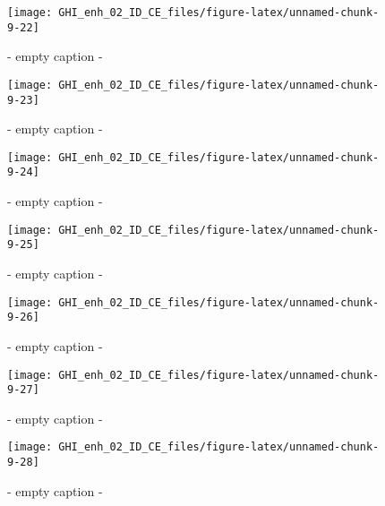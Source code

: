 \documentclass[
  10pt,
  a4paper,oneside]{article}
\begin{document}
\begin{figure}[H]

{\centering \texttt{[image: GHI\_enh\_02\_ID\_CE\_files/figure-latex/unnamed-chunk-9-22]} 

}

\caption{ - empty caption - }\label{fig:unnamed-chunk-9-22}
\end{figure}
\begin{figure}[H]

{\centering \texttt{[image: GHI\_enh\_02\_ID\_CE\_files/figure-latex/unnamed-chunk-9-23]} 

}

\caption{ - empty caption - }\label{fig:unnamed-chunk-9-23}
\end{figure}
\begin{figure}[H]

{\centering \texttt{[image: GHI\_enh\_02\_ID\_CE\_files/figure-latex/unnamed-chunk-9-24]} 

}

\caption{ - empty caption - }\label{fig:unnamed-chunk-9-24}
\end{figure}
\begin{figure}[H]

{\centering \texttt{[image: GHI\_enh\_02\_ID\_CE\_files/figure-latex/unnamed-chunk-9-25]} 

}

\caption{ - empty caption - }\label{fig:unnamed-chunk-9-25}
\end{figure}
\begin{figure}[H]

{\centering \texttt{[image: GHI\_enh\_02\_ID\_CE\_files/figure-latex/unnamed-chunk-9-26]} 

}

\caption{ - empty caption - }\label{fig:unnamed-chunk-9-26}
\end{figure}
\begin{figure}[H]

{\centering \texttt{[image: GHI\_enh\_02\_ID\_CE\_files/figure-latex/unnamed-chunk-9-27]} 

}

\caption{ - empty caption - }\label{fig:unnamed-chunk-9-27}
\end{figure}
\begin{figure}[H]

{\centering \texttt{[image: GHI\_enh\_02\_ID\_CE\_files/figure-latex/unnamed-chunk-9-28]} 

}

\caption{ - empty caption - }\label{fig:unnamed-chunk-9-28}
\end{figure}
\end{document}
